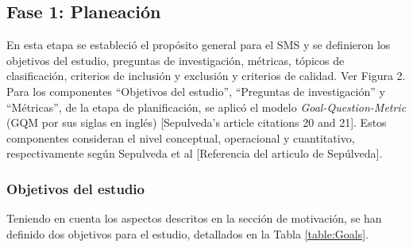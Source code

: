 \subsection{Fase 1: Planeación}
En esta etapa se estableció el propósito general para el SMS y se definieron los objetivos del estudio, preguntas de investigación, métricas, tópicos de clasificación, criterios de inclusión y exclusión y criterios de calidad. Ver Figura 2.
Para los componentes ``Objetivos del estudio'', ``Preguntas de investigación'' y ``Métricas'', de la etapa de planificación, se aplicó el modelo {\itshape Goal-Question-Metric} (GQM por sus siglas en inglés) [Sepulveda's article citations 20 and 21]. Estos componentes consideran el nivel conceptual, operacional y cuantitativo, respectivamente según Sepulveda et al [Referencia del articulo de Sepúlveda].

\subsubsection{Objetivos del estudio}
Teniendo en cuenta los aspectos descritos en la sección de motivación, se han definido dos objetivos para el estudio, detallados en la Tabla \ref{table:Goals}.

